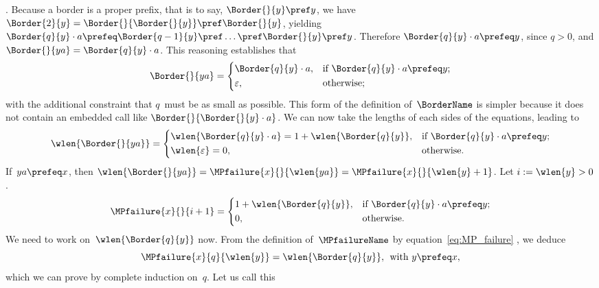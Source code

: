 \prefeq {}\). Because a border is a proper prefix, that
is to say, \(\Border{}{y} \pref y\), we have \(\Border{2}{y} =
\Border{}{\Border{}{y}} \pref \Border{}{y}\), yielding \(\Border{q}{y}
\cdot a \prefeq \Border{q-1}{y} \pref \dots \pref \Border{}{y} \pref
y\). Therefore \(\Border{q}{y} \cdot a \prefeq y\), since \({q > 0}\),
and \(\Border{}{ya} = \Border{q}{y} \cdot a\). This reasoning
establishes that
\begin{equation*}
\Border{}{ya} =
\left\{
  \begin{aligned}
   & \Border{q}{y} \cdot a,
   && \text{if \(\Border{q}{y} \cdot a \prefeq y\)};\\
   & \varepsilon,
   && \text{otherwise;}
  \end{aligned}
\right.
\end{equation*}
with the additional constraint that \(q\)~must be as small as
possible. This form of the definition of~\(\BorderName\) is simpler
because it does not contain an embedded call like
\(\Border{}{\Border{}{y} \cdot a}\). We can now take the lengths of
each sides of the equations, leading to
\begin{equation*}
\wlen{\Border{}{ya}} =
\left\{
  \begin{aligned}
   & \wlen{\Border{q}{y} \cdot a} = 1 + \wlen{\Border{q}{y}},
   && \text{if \(\Border{q}{y} \cdot a \prefeq y\)};\\
   & \wlen{\varepsilon} = 0,
   && \text{otherwise.}
  \end{aligned}
\right.
\end{equation*}
If~\({ya \prefeq x}\), then \(\wlen{\Border{}{ya}} =
\MPfailure{x}{}{\wlen{ya}} = \MPfailure{x}{}{\wlen{y}+1}\). Let \(i :=
\wlen{y} > 0\).
\begin{equation*}
\MPfailure{x}{}{i+1} =
\left\{
  \begin{aligned}
   & 1 + \wlen{\Border{q}{y}},
   && \text{if \(\Border{q}{y} \cdot a \prefeq y\)};\\
   & 0,
   && \text{otherwise.}
  \end{aligned}
\right.
\end{equation*}
We need to work on~\(\wlen{\Border{q}{y}}\) now. From the definition
of~\(\MPfailureName\) by equation~\eqref{eq:MP_failure}
, we deduce
\begin{equation}
\MPfailure{x}{q}{\wlen{y}} = \wlen{\Border{q}{y}},
\,\; \text{with \(y \prefeq x\)},
\label{eq:MP_failure_p}
\end{equation}
which we can prove by complete induction on~\(q\). Let us call this
